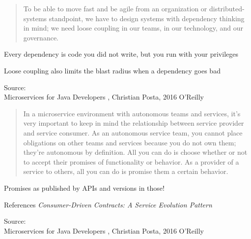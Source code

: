 \documentclass[Screen16to9,17pt]{foils}
\begin{document}
\begin{quote}
  To be able to move fast and be agile from an organization or
  distributed-systems standpoint, we have to design systems with
  dependency thinking in mind; we need loose coupling in our teams,
  in our technology, and our governance.
\end{quote}

\begin{list2}
\item Every dependency is code you did not write, but you run with your privileges
\item Loose coupling also limits the blast radius when a dependency goes bad
\end{list2}

Source: {\footnotesize\\
Microservices for Java Developers , Christian Posta, 2016 O’Reilly}



\begin{quote}
  In a microservice environment with autonomous teams and services, it’s very important to keep in mind the relationship between
  service provider and service consumer. As an autonomous service
  team, you cannot place obligations on other teams and services
  because you do not own them; they’re autonomous by definition. All
  you can do is choose whether or not to accept their promises of
  functionality or behavior. As a provider of a service to others, all you
  can do is promise them a certain behavior.
\end{quote}

\begin{list2}
\item Promises as published by APIs and versions in those!
\item References \emph{Consumer-Driven Contracts: A Service Evolution Pattern}\\
\end{list2}
Source: {\footnotesize\\
Microservices for Java Developers , Christian Posta, 2016 O’Reilly}


\end{document}
